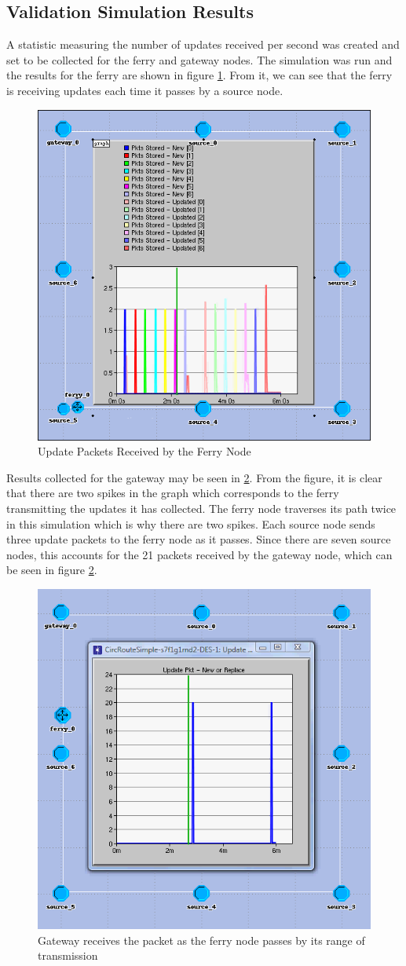 \subsection{Validation Simulation Results}
\label{sec:results-validate}

A statistic measuring the number of updates received per second was created and set to be collected for the ferry and gateway nodes.
The simulation was run and the results for the ferry are shown in figure \ref{fig:result1-a}.  
From it, we can see that the ferry is receiving updates each time it passes by a source node. 

\begin{figure}[ht]
    \centering
    \includegraphics[width=.5\textwidth]{images/scenario1-result-received}
    \caption{Update Packets Received by the Ferry Node}
    \label{fig:result1-a}
\end{figure}

Results collected for the gateway may be seen in \ref{fig:result1-b}.
From the figure, it is clear that there are two spikes in the graph which corresponds to the ferry transmitting the updates it has collected. 
The ferry node traverses its path twice in this simulation which is why there are two spikes.
Each source node sends three update packets to the ferry node as it passes.  
Since there are seven source nodes, this accounts for the 21 packets received by the gateway node, which can be seen in figure \ref{fig:result1-b}.

\begin{figure}[ht]
    \centering
    \includegraphics[width=.5\textwidth]{images/scenario1-result-gateway}
    \caption{Gateway receives the packet as the ferry node passes by its range of transmission}
    \label{fig:result1-b}
\end{figure}

